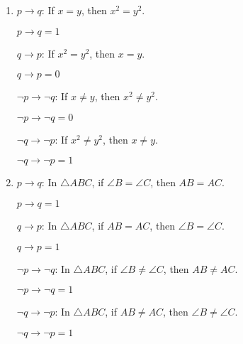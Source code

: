 \documentclass{report}
\begin{document}
\begin{solution}
    \item \begin{enumerate}[label=(\alph*), leftmargin=*]
        \item $p \rightarrow q$: If $x = y$, then $x^2 = y^2$.

              $p \rightarrow q = 1$

              $q \rightarrow p$: If $x^2 = y^2$, then $x = y$.

              $q \rightarrow p = 0$

              $\neg p \rightarrow \neg q$: If $x \neq y$, then $x^2 \neq y^2$.

              $\neg p \rightarrow \neg q = 0$

              $\neg q \rightarrow \neg p$: If $x^2 \neq y^2$, then $x \neq y$.

              $\neg q \rightarrow \neg p = 1$

        \item $p \rightarrow q$: In $\triangle ABC$, if $\angle B = \angle C$, then $AB = AC$.

              $p \rightarrow q = 1$

              $q \rightarrow p$: In $\triangle ABC$, if $AB = AC$, then $\angle B = \angle C$.

              $q \rightarrow p = 1$

              $\neg p \rightarrow \neg q$: In $\triangle ABC$, if $\angle B \neq \angle C$, then $AB \neq AC$.

              $\neg p \rightarrow \neg q = 1$

              $\neg q \rightarrow \neg p$: In $\triangle ABC$, if $AB \neq AC$, then $\angle B \neq \angle C$.

              $\neg q \rightarrow \neg p = 1$
    \end{enumerate}
\end{solution}
\end{document}
